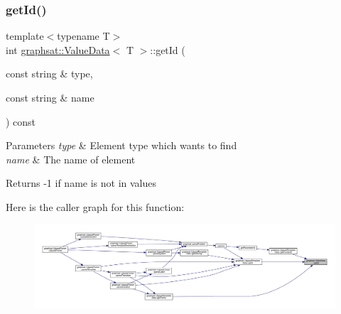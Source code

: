 \mbox{\label{classgraphsat_1_1_value_data_a08fe1d8569af3f9e0b4906528c527339}} 
\subsubsection{\texorpdfstring{getId()}{getId()}}
{\footnotesize\ttfamily template$<$typename T$>$ \\
int \mbox{\hyperlink{classgraphsat_1_1_value_data}{graphsat\+::\+Value\+Data}}$<$ T $>$\+::get\+Id (\begin{DoxyParamCaption}\item[{const string \&}]{type,  }\item[{const string \&}]{name }\end{DoxyParamCaption}) const\hspace{0.3cm}{\ttfamily [inline]}}


\begin{DoxyParams}{Parameters}
{\em type} & Element type which wants to find \\
\hline
{\em name} & The name of element\\
\hline
\end{DoxyParams}
\begin{DoxyReturn}{Returns}
-\/1 if name is not in values 
\end{DoxyReturn}
Here is the caller graph for this function\+:
\nopagebreak
\begin{figure}[H]
\begin{center}
\leavevmode
\includegraphics[width=350pt]{classgraphsat_1_1_value_data_a08fe1d8569af3f9e0b4906528c527339_icgraph}
\end{center}
\end{figure}
\mbox{\label{classgraphsat_1_1_value_data_ab6782ef0d92876cb39ea1a8bf2d486c6}} 
